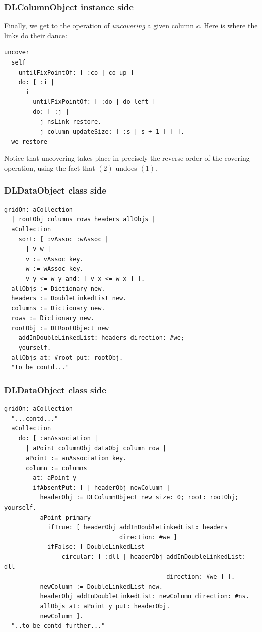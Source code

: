 \documentclass[10pt]{beamer}
\begin{document}
\begin{frame}[fragile]
\frametitle{DLColumnObject instance side}
Finally, we get to the operation of \textit{uncovering} a given column $c$. 
Here is where the links do their dance:
\vfill
\begin{verbatim}
uncover
  self
    untilFixPointOf: [ :co | co up ]
    do: [ :i | 
      i
        untilFixPointOf: [ :do | do left ]
        do: [ :j | 
          j nsLink restore.
          j column updateSize: [ :s | s + 1 ] ] ].
  we restore
\end{verbatim}
\vfill
Notice that uncovering takes place in precisely the reverse order of the 
covering operation, using the fact that $(2)$ undoes $(1)$.
\end{frame}

\begin{frame}[fragile]
\frametitle{DLDataObject class side}
\begin{verbatim}
gridOn: aCollection
  | rootObj columns rows headers allObjs |
  aCollection
    sort: [ :vAssoc :wAssoc | 
      | v w |
      v := vAssoc key.
      w := wAssoc key.
      v y <= w y and: [ v x <= w x ] ].
  allObjs := Dictionary new.
  headers := DoubleLinkedList new.
  columns := Dictionary new.
  rows := Dictionary new.
  rootObj := DLRootObject new
    addInDoubleLinkedList: headers direction: #we;
    yourself.
  allObjs at: #root put: rootObj.
  "to be contd..."
\end{verbatim}
\end{frame}

\begin{frame}[fragile]
\frametitle{DLDataObject class side}
\begin{verbatim}
gridOn: aCollection
  "...contd..."
  aCollection
    do: [ :anAssociation | 
      | aPoint columnObj dataObj column row |
      aPoint := anAssociation key.
      column := columns
        at: aPoint y
        ifAbsentPut: [ | headerObj newColumn |
          headerObj := DLColumnObject new size: 0; root: rootObj; yourself.
          aPoint primary
            ifTrue: [ headerObj addInDoubleLinkedList: headers 
                                direction: #we ]
            ifFalse: [ DoubleLinkedList
                circular: [ :dll | headerObj addInDoubleLinkedList: dll 
                                             direction: #we ] ].
          newColumn := DoubleLinkedList new.
          headerObj addInDoubleLinkedList: newColumn direction: #ns.
          allObjs at: aPoint y put: headerObj.
          newColumn ].
  "..to be contd further..."
\end{verbatim}
\end{frame}
\end{document}
